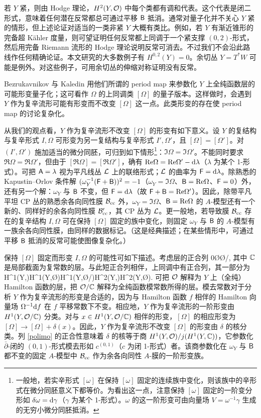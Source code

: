 若 $Y$ 紧，则由 Hodge 理论，$H^2(Y,{\mathcal O})$ 中每个类都有调和代表。这个代表是闭二形式，意味着任何潜在反常都总可通过平移 ${\sf B}$ 抵消。通常对量子化并不关心 $Y$ 紧的情形，但上述论证对适当的一类非紧 $Y$ 大概有类比。例如，若 $Y$ 有渐近锥形的完备超 Kähler 度量，则可望证明任何反常都上同调于一个紧支撑 $(0,2)$-形式，然后用完备 Riemann 流形的 Hodge 理论说明反常可消去。不过我们不会沿此路线作任何精确论证。本文研究的大多数例子有 $H^{0,2}(Y)=0$。余切丛 $Y=T^*W$ 可能是例外。对这些例子，可用余切丛的伸缩对称证明没有反常。

Bezrukavnikov 与 Kaledin 用他们所谓的 period map 来参数化 $Y$ 上全纯函数层的可能形变量子化；这可看作 $\Omega$ 的上同调类 $[\Omega]$ 的量子版本。这样做时，会遇到 $Y$ 作为复辛流形可能有形变而不改变 $[\Omega]$ 这一点。此类形变的存在使 period map 的讨论复杂化。

从我们的观点看，$Y$ 作为复辛流形不改变 $[\Omega]$ 的形变有如下意义。设 $Y$ 的复结构与复辛形式 $I,\Omega$ 可形变为另一复结构与复辛形式 $I',\Omega'$，且 $[\Omega]=[\Omega']$。对 $(I',\Omega')$ 施加适当的微分同胚，可归到如下情形\footnote{一般地，若实辛形式 $[\omega]$ 在保持 $[\omega]$ 固定的连续族中变化，则该族中的辛形式在微分同胚意义下都等价。为看出这一点，注意保持 $[\omega]$ 固定的一阶变分形如 $\delta\omega={\mathrm d}\gamma$（$\gamma$ 为某个 1-形式）。$\omega$ 的这一阶形变可由向量场 $V=\omega^{-1}\gamma$ 生成的无穷小微分同胚抵消。}：$\Im\Omega=\Im\Omega'$。不能同时要求 $\Re\Omega=\Re\Omega'$，但由于 $[\Re\Omega]=[\Re\Omega']$，确有 ${\mathrm{Re}}\Omega={\mathrm{Re}}\Omega'-{\mathrm d}\lambda$（$\lambda$ 为某个 1-形式）。可把 ${\sf A}=\lambda$ 视为平凡线丛 ${\mathcal L}$ 上的联络形式；${\mathcal L}$ 的曲率为 ${\sf F}={\mathrm d}\lambda$。除熟悉的 Kapustin--Orlov 条件解 $(\omega_Y^{-1}({\sf F}+{\sf B}))^2=-1$（$\omega_Y=\Im\Omega$、${\sf B}={\mathrm{Re}}\Omega$、${\sf F}=0$）外，还有另一个解：$\omega_Y$ 与 ${\sf B}$ 不变，但 ${\sf F}={\mathrm d}\lambda$（故 ${\sf F}+{\sf B}={\mathrm{Re}}\Omega'$）。因此，除带平凡平坦 CP 丛的熟悉余各向同性膜 ${\mathcal B}_{\mathrm{cc}}$ 外，$\omega_Y=\Im\Omega$、${\sf B}={\mathrm{Re}}\Omega$ 的 $A$-模型还有一个新的、同样好的余各向同性膜 ${\mathcal B}_{\mathrm{cc}}'$，其 CP 丛为 ${\mathcal L}$。更一般地，若导致膜 ${\mathcal B}_{\mathrm{cc}}$ 存在的复辛结构 $I,\Omega$ 可在保持 $[\Omega]$ 固定的族中变化，则固定 $\omega_Y$ 与 ${\sf B}$ 的 $A$-模型有一族余各向同性膜，由同样的数据标记。（这是经典描述；在某些情形中，可通过平移 ${\sf B}$ 抵消的反常可能使图像复杂化。）

保持 $[\Omega]$ 固定而形变 $I,\Omega$ 的可能性可如下描述。考虑层的正合列
\be\label{tolimo}0\to\C\to\O\to\O/\C{},\ee
其中 ${\mathbb C}$ 是局部截面为复常数的层。与此短正合列相伴，上同调中有正合列，其一部分为
\be\label{polimo}\cdots\to H^1(Y,\C)H^1(Y,\O)\to H^1(Y,\O/\C)\xrightarrow{\delta}H^2(Y,\C)H^2(Y,\O)\to\cdots.\ee
可把 ${\mathcal O}$ 解释为 $Y$ 上（全纯）Hamilton 函数的层，把 ${\mathcal O}/{\mathbb C}$ 解释为全纯函数模常数所得的层。模去常数对于分析 $Y$ 作为复辛流形的形变是合适的，因为与 Hamilton 函数 $f$ 相伴的 Hamilton 向量场 $\Omega^{-1}{\mathrm d} f$ 在 $f$ 平移常数下不变。相应地，$Y$ 作为复辛流形的一阶形变由 $H^1(Y,{\mathcal O}/{\mathbb C})$ 分类。对与 $x\in H^1(Y,{\mathcal O}/{\mathbb C})$ 相伴的形变，$[\Omega]$ 的相应形变为 $[\Omega]\to[\Omega]+\delta(x)$。因此，$Y$ 作为复辛流形不改变 $[\Omega]$ 的形变由 $\delta$ 的核分类。列 \eqref{polimo} 的正合性意味着 $\delta$ 的核等于商 $H^1(Y,{\mathcal O})/j(H^1(Y,{\mathbb C}))$，它参数化 $\bar\partial$-闭的 $(0,1)$-形式模去形如 $c^{(0,1)}$（$c$ 为闭 1-形式）者。该商参数化在 $\omega_Y$ 与 ${\sf B}$ 都不变的固定 $A$-模型中 ${\mathcal B}_{\mathrm{cc}}$ 作为余各向同性 $A$-膜的一阶形变族。
